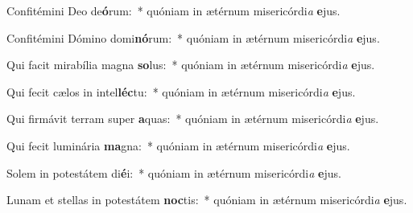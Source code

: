 \item Confitémini Deo de\textbf{ó}rum:~* quóniam in ætérnum misericórdi\textit{a} \textbf{e}jus.
\item Confitémini Dómino domi\textbf{nó}rum:~* quóniam in ætérnum misericórdi\textit{a} \textbf{e}jus.
\item Qui facit mirabília magna \textbf{so}lus:~* quóniam in ætérnum misericórdi\textit{a} \textbf{e}jus.
\item Qui fecit cælos in intel\textbf{léc}tu:~* quóniam in ætérnum misericórdi\textit{a} \textbf{e}jus.
\item Qui firmávit terram super \textbf{a}quas:~* quóniam in ætérnum misericórdi\textit{a} \textbf{e}jus.
\item Qui fecit luminária \textbf{ma}gna:~* quóniam in ætérnum misericórdi\textit{a} \textbf{e}jus.
\item Solem in potestátem di\textbf{é}i:~* quóniam in ætérnum misericórdi\textit{a} \textbf{e}jus.
\item Lunam et stellas in potestátem \textbf{noc}tis:~* quóniam in ætérnum misericórdi\textit{a} \textbf{e}jus.
